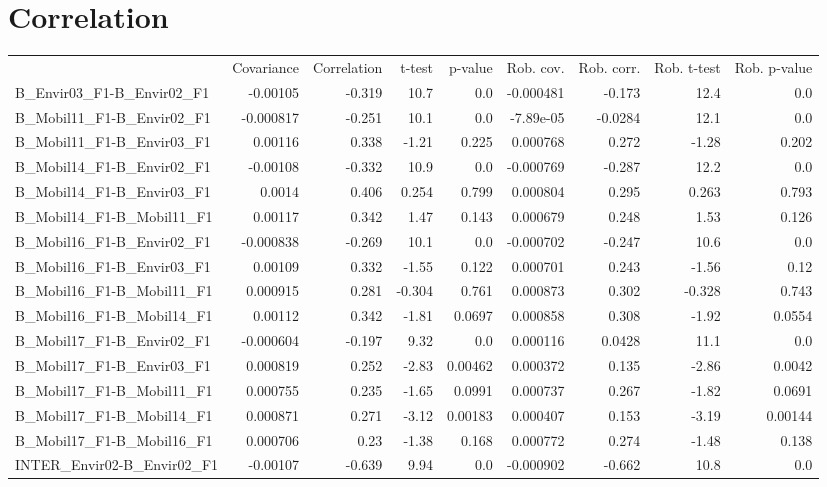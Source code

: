 \section{Correlation}
\begin{tabular}{lrrrrrrrr}
 & Covariance & Correlation & t-test & p-value & Rob. cov. & Rob. corr. & Rob. t-test & Rob. p-value \\
B_Envir03_F1-B_Envir02_F1 & -0.00105 & -0.319 & 10.7 & 0.0 & -0.000481 & -0.173 & 12.4 & 0.0 \\
B_Mobil11_F1-B_Envir02_F1 & -0.000817 & -0.251 & 10.1 & 0.0 & -7.89e-05 & -0.0284 & 12.1 & 0.0 \\
B_Mobil11_F1-B_Envir03_F1 & 0.00116 & 0.338 & -1.21 & 0.225 & 0.000768 & 0.272 & -1.28 & 0.202 \\
B_Mobil14_F1-B_Envir02_F1 & -0.00108 & -0.332 & 10.9 & 0.0 & -0.000769 & -0.287 & 12.2 & 0.0 \\
B_Mobil14_F1-B_Envir03_F1 & 0.0014 & 0.406 & 0.254 & 0.799 & 0.000804 & 0.295 & 0.263 & 0.793 \\
B_Mobil14_F1-B_Mobil11_F1 & 0.00117 & 0.342 & 1.47 & 0.143 & 0.000679 & 0.248 & 1.53 & 0.126 \\
B_Mobil16_F1-B_Envir02_F1 & -0.000838 & -0.269 & 10.1 & 0.0 & -0.000702 & -0.247 & 10.6 & 0.0 \\
B_Mobil16_F1-B_Envir03_F1 & 0.00109 & 0.332 & -1.55 & 0.122 & 0.000701 & 0.243 & -1.56 & 0.12 \\
B_Mobil16_F1-B_Mobil11_F1 & 0.000915 & 0.281 & -0.304 & 0.761 & 0.000873 & 0.302 & -0.328 & 0.743 \\
B_Mobil16_F1-B_Mobil14_F1 & 0.00112 & 0.342 & -1.81 & 0.0697 & 0.000858 & 0.308 & -1.92 & 0.0554 \\
B_Mobil17_F1-B_Envir02_F1 & -0.000604 & -0.197 & 9.32 & 0.0 & 0.000116 & 0.0428 & 11.1 & 0.0 \\
B_Mobil17_F1-B_Envir03_F1 & 0.000819 & 0.252 & -2.83 & 0.00462 & 0.000372 & 0.135 & -2.86 & 0.0042 \\
B_Mobil17_F1-B_Mobil11_F1 & 0.000755 & 0.235 & -1.65 & 0.0991 & 0.000737 & 0.267 & -1.82 & 0.0691 \\
B_Mobil17_F1-B_Mobil14_F1 & 0.000871 & 0.271 & -3.12 & 0.00183 & 0.000407 & 0.153 & -3.19 & 0.00144 \\
B_Mobil17_F1-B_Mobil16_F1 & 0.000706 & 0.23 & -1.38 & 0.168 & 0.000772 & 0.274 & -1.48 & 0.138 \\
INTER_Envir02-B_Envir02_F1 & -0.00107 & -0.639 & 9.94 & 0.0 & -0.000902 & -0.662 & 10.8 & 0.0 \\

\end{tabular}
